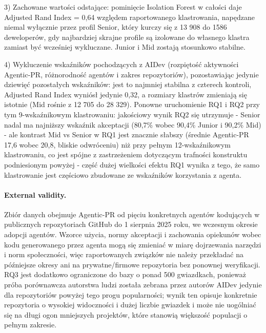 3) Zachowane wartości odstające: pominięcie Isolation Forest w całości daje Adjusted Rand Index = 0,64 względem raportowanego klastrowania, napędzane niemal wyłącznie przez profil Senior, który kurczy się z 13 908 do 1586 deweloperów, gdy najbardziej skrajne profile są izolowane do własnego klastra zamiast być wcześniej wykluczane. Junior i Mid zostają stosunkowo stabilne.

4) Wykluczenie wskaźników pochodzących z AIDev (rozpiętość aktywności Agentic-PR, różnorodność agentów i zakres repozytoriów), pozostawiając jedynie dziewięć pozostałych wskaźników: jest to najmniej stabilna z czterech kontroli, Adjusted Rand Index wyniósł jedynie 0,32, a rozmiary klastrów zmieniają się istotnie (Mid rośnie z 12 705 do 28 329). Ponowne uruchomienie RQ1 i RQ2 przy tym 9-wskaźnikowym klastrowaniu: jakościowy wynik RQ2 się utrzymuje - Senior nadal ma najniższy wskaźnik akceptacji (80,7\% wobec 90,4\% Junior i 90,2\% Mid) - ale kontrast Mid vs Senior w RQ1 jest znacznie słabszy (średnie Agentic-PR 17,6 wobec 20,8, bliskie odwróceniu) niż przy pełnym 12-wskaźnikowym klastrowaniu, co jest spójne z zastrzeżeniem dotyczącym trafności konstruktu podniesionym powyżej - część dużej wielkości efektu RQ1 wynika z tego, że samo klastrowanie jest częściowo zbudowane ze wskaźników korzystania z agenta.

\paragraph{External validity.}
Zbiór danych obejmuje Agentic-PR od pięciu konkretnych agentów kodujących w publicznych repozytoriach GitHub do 1 sierpnia 2025 roku, we wczesnym okresie adopcji agentów. Wzorce użycia, normy akceptacji i zachowania opiekunów wobec kodu generowanego przez agenta mogą się zmieniać w miarę dojrzewania narzędzi i norm społeczności, więc raportowanych związków nie należy przekładać na późniejsze okresy ani na prywatne/firmowe repozytoria bez ponownej weryfikacji. RQ3 jest dodatkowo ograniczone do bazy o ponad 500 gwiazdkach, ponieważ próba porównawcza autorstwa ludzi została zebrana przez autorów AIDev jedynie dla repozytoriów powyżej tego progu popularności; wynik ten opisuje konkretnie repozytoria o wysokiej widoczności i dużej liczbie gwiazdek i może nie uogólniać się na długi ogon mniejszych projektów, które stanowią większość populacji o pełnym zakresie.

